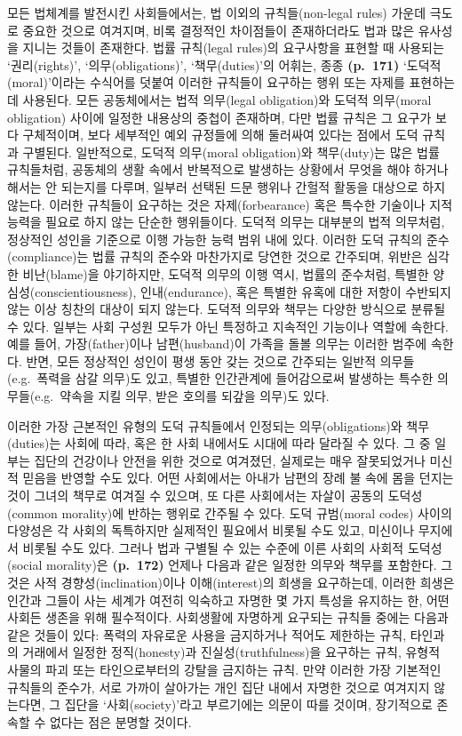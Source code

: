 모든 법체계를 발전시킨 사회들에서는, 법 이외의 규칙들(non-legal rules)
가운데 극도로 중요한 것으로 여겨지며, 비록 결정적인 차이점들이
존재하더라도 법과 많은 유사성을 지니는 것들이 존재한다. 법률 규칙(legal
rules)의 요구사항을 표현할 때 사용되는 `권리(rights)',
`의무(obligations)', `책무(duties)'의 어휘는, 종종 \textbf{(p.~171)}
`도덕적(moral)'이라는 수식어를 덧붙여 이러한 규칙들이 요구하는 행위 또는
자제를 표현하는 데 사용된다. 모든 공동체에서는 법적 의무(legal
obligation)와 도덕적 의무(moral obligation) 사이에 일정한 내용상의
중첩이 존재하며, 다만 법률 규칙은 그 요구가 보다 구체적이며, 보다
세부적인 예외 규정들에 의해 둘러싸여 있다는 점에서 도덕 규칙과 구별된다.
일반적으로, 도덕적 의무(moral obligation)와 책무(duty)는 많은 법률
규칙들처럼, 공동체의 생활 속에서 반복적으로 발생하는 상황에서 무엇을
해야 하거나 해서는 안 되는지를 다루며, 일부러 선택된 드문 행위나 간헐적
활동을 대상으로 하지 않는다. 이러한 규칙들이 요구하는 것은
자제(forbearance) 혹은 특수한 기술이나 지적 능력을 필요로 하지 않는
단순한 행위들이다. 도덕적 의무는 대부분의 법적 의무처럼, 정상적인 성인을
기준으로 이행 가능한 능력 범위 내에 있다. 이러한 도덕 규칙의
준수(compliance)는 법률 규칙의 준수와 마찬가지로 당연한 것으로 간주되며,
위반은 심각한 비난(blame)을 야기하지만, 도덕적 의무의 이행 역시, 법률의
준수처럼, 특별한 양심성(conscientiousness), 인내(endurance), 혹은 특별한
유혹에 대한 저항이 수반되지 않는 이상 칭찬의 대상이 되지 않는다. 도덕적
의무와 책무는 다양한 방식으로 분류될 수 있다. 일부는 사회 구성원 모두가
아닌 특정하고 지속적인 기능이나 역할에 속한다. 예를 들어,
가장(father)이나 남편(husband)이 가족을 돌볼 의무는 이러한 범주에
속한다. 반면, 모든 정상적인 성인이 평생 동안 갖는 것으로 간주되는 일반적
의무들(e.g.~폭력을 삼갈 의무)도 있고, 특별한 인간관계에 들어감으로써
발생하는 특수한 의무들(e.g.~약속을 지킬 의무, 받은 호의를 되갚을 의무)도
있다.

이러한 가장 근본적인 유형의 도덕 규칙들에서 인정되는 의무(obligations)와
책무(duties)는 사회에 따라, 혹은 한 사회 내에서도 시대에 따라 달라질 수
있다. 그 중 일부는 집단의 건강이나 안전을 위한 것으로 여겨졌던, 실제로는
매우 잘못되었거나 미신적 믿음을 반영할 수도 있다. 어떤 사회에서는 아내가
남편의 장례 불 속에 몸을 던지는 것이 그녀의 책무로 여겨질 수 있으며, 또
다른 사회에서는 자살이 공동의 도덕성(common morality)에 반하는 행위로
간주될 수 있다. 도덕 규범(moral codes) 사이의 다양성은 각 사회의
독특하지만 실제적인 필요에서 비롯될 수도 있고, 미신이나 무지에서 비롯될
수도 있다. 그러나 법과 구별될 수 있는 수준에 이른 사회의 사회적
도덕성(social morality)은 \textbf{(p.~172)} 언제나 다음과 같은 일정한
의무와 책무를 포함한다. 그것은 사적 경향성(inclination)이나
이해(interest)의 희생을 요구하는데, 이러한 희생은 인간과 그들이 사는
세계가 여전히 익숙하고 자명한 몇 가지 특성을 유지하는 한, 어떤 사회든
생존을 위해 필수적이다. 사회생활에 자명하게 요구되는 규칙들 중에는
다음과 같은 것들이 있다: 폭력의 자유로운 사용을 금지하거나 적어도
제한하는 규칙, 타인과의 거래에서 일정한 정직(honesty)과
진실성(truthfulness)을 요구하는 규칙, 유형적 사물의 파괴 또는
타인으로부터의 강탈을 금지하는 규칙. 만약 이러한 가장 기본적인 규칙들의
준수가, 서로 가까이 살아가는 개인 집단 내에서 자명한 것으로 여겨지지
않는다면, 그 집단을 `사회(society)'라고 부르기에는 의문이 따를 것이며,
장기적으로 존속할 수 없다는 점은 분명할 것이다.


